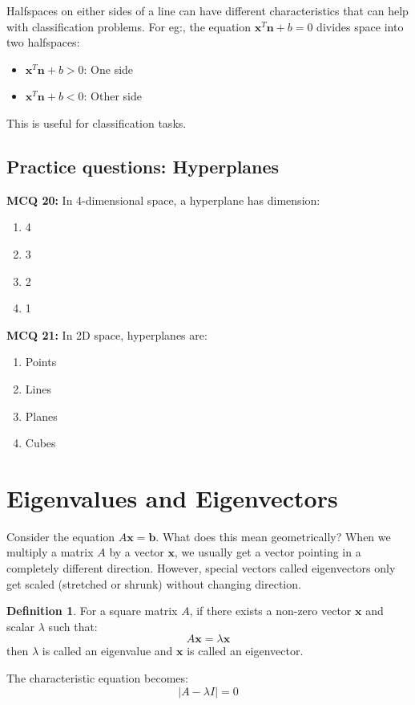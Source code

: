 \documentclass[11pt,a4paper]{article}
\theoremstyle{definition}
\newtheorem{definition}{Definition}[section]
\begin{document}
Halfspaces on either sides of a line can have different characteristics that can help with classification problems. For eg:, the equation $\mathbf{x}^T \mathbf{n} + b = 0$ divides space into two halfspaces:
\begin{itemize}
    \item $\mathbf{x}^T \mathbf{n} + b > 0$: One side
    \item $\mathbf{x}^T \mathbf{n} + b < 0$: Other side
\end{itemize}

This is useful for classification tasks.

\subsection{Practice questions: Hyperplanes}

\textbf{MCQ 20:} In 4-dimensional space, a hyperplane has dimension:

\begin{enumerate}
    \item 4
    \item 3
    \item 2
    \item 1
\end{enumerate}


\noindent \textbf{MCQ 21:} In 2D space, hyperplanes are:

\begin{enumerate}
    \item Points
    \item Lines
    \item Planes
    \item Cubes
\end{enumerate}


\section{Eigenvalues and Eigenvectors}


Consider the equation $A\mathbf{x} = \mathbf{b}$. What does this mean geometrically? When we multiply a matrix $A$ by a vector $\mathbf{x}$, we usually get a vector pointing in a completely different direction. 
However, special vectors called eigenvectors only get scaled (stretched or shrunk) without changing direction.


\begin{defbox}
\begin{definition}
For a square matrix $A$, if there exists a non-zero vector $\mathbf{x}$ and scalar $\lambda$ such that:
\[A\mathbf{x} = \lambda\mathbf{x}\]
then $\lambda$ is called an eigenvalue and $\mathbf{x}$ is called an eigenvector.

The characteristic equation becomes:
\[|A - \lambda I| = 0\]
\end{definition}
\end{defbox}
\end{document}
